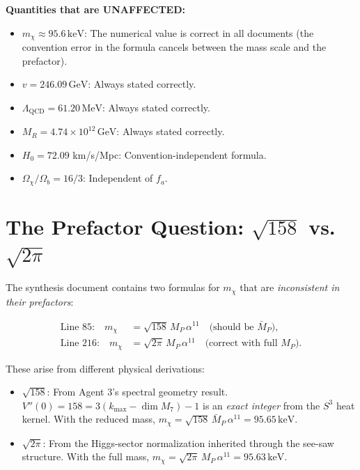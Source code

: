 \documentclass[11pt]{article}
\newcommand{\MP}{M_P}
\newcommand{\MPbar}{\bar{M}_P}
\newcommand{\GeV}{\,\mathrm{GeV}}
\newcommand{\MeV}{\,\mathrm{MeV}}
\newcommand{\keV}{\,\mathrm{keV}}
\begin{document}
\textbf{Quantities that are UNAFFECTED:}
\begin{itemize}
\item $m_\chi \approx 95.6\keV$: The numerical value is correct in all documents
  (the convention error in the formula cancels between the mass scale and the
  prefactor).
\item $v = 246.09\GeV$: Always stated correctly.
\item $\Lambda_\mathrm{QCD} = 61.20\MeV$: Always stated correctly.
\item $M_R = 4.74 \times 10^{12}\GeV$: Always stated correctly.
\item $H_0 = 72.09$ km/s/Mpc: Convention-independent formula.
\item $\Omega_\chi/\Omega_b = 16/3$: Independent of $f_a$.
\end{itemize}

\section{The Prefactor Question: $\sqrt{158}$ vs.\ $\sqrt{2\pi}$}

The synthesis document contains two formulas for $m_\chi$ that are
\textit{inconsistent in their prefactors}:

\begin{align}
  \text{Line 85:}\quad m_\chi &= \sqrt{158}\,\MP\,\alpha^{11}
  \quad\text{(should be }\MPbar\text{)}, \\
  \text{Line 216:}\quad m_\chi &= \sqrt{2\pi}\,\MP\,\alpha^{11}
  \quad\text{(correct with full }\MP\text{)}.
\end{align}

These arise from different physical derivations:
\begin{itemize}
\item $\sqrt{158}$: From Agent 3's spectral geometry result.
  $V''(0) = 158 = 3(k_\mathrm{max} - \dim M_7) - 1$ is an \textit{exact integer}
  from the $S^3$ heat kernel. With the reduced mass,
  $m_\chi = \sqrt{158}\,\MPbar\,\alpha^{11} = 95.65\keV$.

\item $\sqrt{2\pi}$: From the Higgs-sector normalization inherited through the
  see-saw structure. With the full mass,
  $m_\chi = \sqrt{2\pi}\,\MP\,\alpha^{11} = 95.63\keV$.
\end{itemize}
\end{document}
